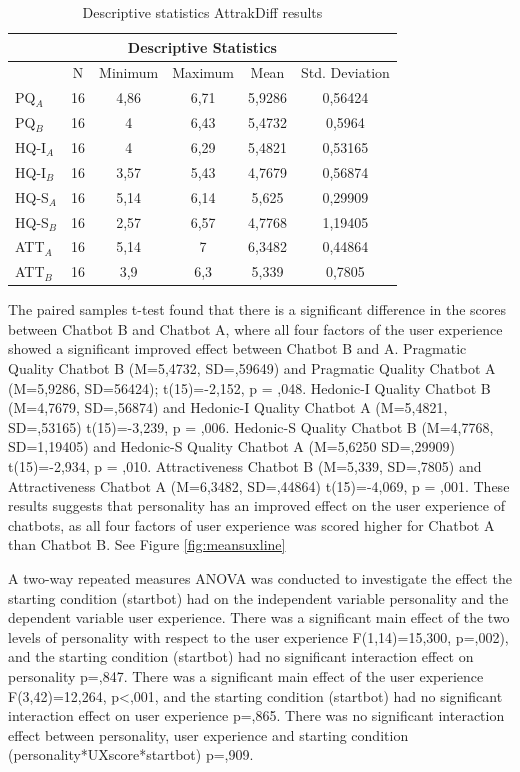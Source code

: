 \begin{table}[h]
\centering
\begin{tabular}{lccccc}
\hline
\multicolumn{6}{c}{\textbf{Descriptive Statistics}} \\
\hline
& N & Minimum & Maximum & Mean & Std. Deviation \\
PQ$_A$ & 16 & 4,86 & 6,71 & 5,9286 & 0,56424 \\
PQ$_B$ & 16 & 4 & 6,43 & 5,4732 & 0,5964 \\
HQ-I$_A$ & 16 & 4 & 6,29 & 5,4821 & 0,53165 \\
HQ-I$_B$ & 16 & 3,57 & 5,43 & 4,7679 & 0,56874 \\
HQ-S$_A$ & 16 & 5,14 & 6,14 & 5,625 & 0,29909 \\
HQ-S$_B$ & 16 & 2,57 & 6,57 & 4,7768 & 1,19405 \\
ATT$_A$ & 16 & 5,14 & 7 & 6,3482 & 0,44864 \\
ATT$_B$ & 16 & 3,9 & 6,3 & 5,339 & 0,7805 \\
\end{tabular}
\caption{Descriptive statistics AttrakDiff results}
 \label{table:6}
    \end{table}

The paired samples t-test found that there is a significant difference in the scores between Chatbot B and Chatbot A, where all four factors of the user experience showed a significant improved effect between Chatbot B and A. Pragmatic Quality Chatbot B (M=5,4732, SD=,59649) and Pragmatic Quality Chatbot A (M=5,9286, SD=56424); t(15)=-2,152, p = ,048. Hedonic-I Quality Chatbot B (M=4,7679, SD=,56874) and Hedonic-I Quality Chatbot A (M=5,4821, SD=,53165) t(15)=-3,239, p = ,006. Hedonic-S Quality Chatbot B (M=4,7768, SD=1,19405) and Hedonic-S Quality Chatbot A (M=5,6250 SD=,29909) t(15)=-2,934, p = ,010. Attractiveness Chatbot B (M=5,339, SD=,7805) and Attractiveness Chatbot A (M=6,3482, SD=,44864) t(15)=-4,069, p = ,001. These results suggests that personality has an improved effect on the user experience of chatbots, as all four factors of user experience was scored higher for Chatbot A than Chatbot B. See Figure \ref{fig:meansuxline}

A two-way repeated measures ANOVA was conducted to investigate the effect the starting condition (startbot) had on the independent variable personality and the dependent variable user experience. There was a significant main effect of the two levels of personality with respect to the user experience F(1,14)=15,300, p=,002), and the starting condition (startbot) had no significant interaction effect on personality p=,847. There was a significant main effect of the user experience F(3,42)=12,264, p<,001, and the starting condition (startbot) had no significant interaction effect on user experience p=,865. There was no significant interaction effect between personality, user experience and starting condition (personality*UXscore*startbot) p=,909.

